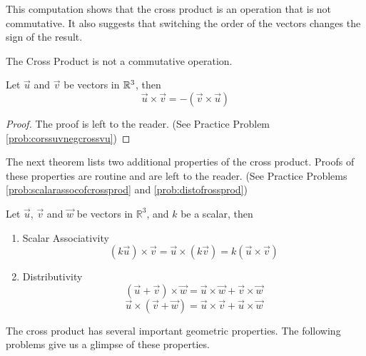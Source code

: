 \documentclass{ximera}
\begin{document}
\begin{exploration}
This computation shows that the cross product is an operation that is not commutative. It also suggests that switching the order of the vectors changes the sign of the result.
\end{exploration}
 
\begin{warning}The Cross Product is not a commutative operation.
\end{warning}
 
\begin{theorem}\label{th:corssuvnegcrossvu}
Let $\vec{u}$ and $\vec{v}$ be vectors in $\mathbb{R}^3$, then
$$\vec{u}\times\vec{v}=-(\vec{v}\times\vec{u})$$
\end{theorem}
\begin{proof}
The proof is left to the reader.  (See Practice Problem \ref{prob:corssuvnegcrossvu})
\end{proof}
The next theorem lists two additional properties of the cross product.  Proofs of these properties are routine and are left to the reader.  (See Practice Problems \ref{prob:scalarassocofcrossprod} and \ref{prob:distofrossprod})
\begin{theorem}\label{th:crossproductproperties}
Let $\vec{u}$, $\vec{v}$ and $\vec{w}$ be vectors in $\mathbb{R}^3$, and $k$ be a scalar, then\\
\begin{enumerate}
\item\label{item:scalarassocofcrossprod} Scalar Associativity
$$(k\vec{u})\times \vec{v}=\vec{u}\times (k\vec{v})=k(\vec{u}\times \vec{v})$$
\item\label{item:distofrossprod} Distributivity
$$(\vec{u}+\vec{v})\times \vec{w}=\vec{u}\times \vec{w}+\vec{v}\times \vec{w}$$
$$\vec{u}\times (\vec{v}+\vec{w})=\vec{u}\times \vec{v}+\vec{u}\times \vec{w}$$
\end{enumerate}
\end{theorem}
 
The cross product has several important geometric properties. The following problems give us a glimpse of these properties.
 
\end{document}
